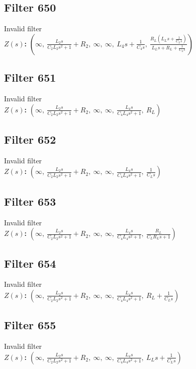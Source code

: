 \documentclass{article}
\begin{document}
\subsection*{Filter 650}
Invalid filter \\ 
\textbf{$Z(s)$:} $\left( \infty, \  \frac{L_{2} s}{C_{2} L_{2} s^{2} + 1} + R_{2}, \  \infty, \  \infty, \  L_{4} s + \frac{1}{C_{4} s}, \  \frac{R_{L} \left(L_{L} s + \frac{1}{C_{L} s}\right)}{L_{L} s + R_{L} + \frac{1}{C_{L} s}}\right)$ \\ 
\subsection*{Filter 651}
Invalid filter \\ 
\textbf{$Z(s)$:} $\left( \infty, \  \frac{L_{2} s}{C_{2} L_{2} s^{2} + 1} + R_{2}, \  \infty, \  \infty, \  \frac{L_{4} s}{C_{4} L_{4} s^{2} + 1}, \  R_{L}\right)$ \\ 
\subsection*{Filter 652}
Invalid filter \\ 
\textbf{$Z(s)$:} $\left( \infty, \  \frac{L_{2} s}{C_{2} L_{2} s^{2} + 1} + R_{2}, \  \infty, \  \infty, \  \frac{L_{4} s}{C_{4} L_{4} s^{2} + 1}, \  \frac{1}{C_{L} s}\right)$ \\ 
\subsection*{Filter 653}
Invalid filter \\ 
\textbf{$Z(s)$:} $\left( \infty, \  \frac{L_{2} s}{C_{2} L_{2} s^{2} + 1} + R_{2}, \  \infty, \  \infty, \  \frac{L_{4} s}{C_{4} L_{4} s^{2} + 1}, \  \frac{R_{L}}{C_{L} R_{L} s + 1}\right)$ \\ 
\subsection*{Filter 654}
Invalid filter \\ 
\textbf{$Z(s)$:} $\left( \infty, \  \frac{L_{2} s}{C_{2} L_{2} s^{2} + 1} + R_{2}, \  \infty, \  \infty, \  \frac{L_{4} s}{C_{4} L_{4} s^{2} + 1}, \  R_{L} + \frac{1}{C_{L} s}\right)$ \\ 
\subsection*{Filter 655}
Invalid filter \\ 
\textbf{$Z(s)$:} $\left( \infty, \  \frac{L_{2} s}{C_{2} L_{2} s^{2} + 1} + R_{2}, \  \infty, \  \infty, \  \frac{L_{4} s}{C_{4} L_{4} s^{2} + 1}, \  L_{L} s + \frac{1}{C_{L} s}\right)$ \\ 
\end{document}

